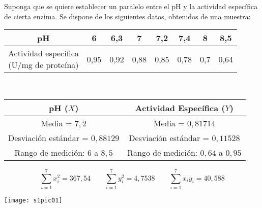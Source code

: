 \documentclass[11pt,spanish]{exam}
\begin{document}
\begin{questions}

\bigskip

\question
Suponga que se quiere establecer un paralelo entre el pH y la actividad específica de cierta enzima. Se dispone de los siguientes datos, obtenidos de una muestra:

\begin{center}
\begin{tabular}{c|ccccccc}
\toprule
pH & 6 & 6,3 & 7 & 7,2 & 7,4 & 8 & 8,5 \\
\hline
\specialcell{Actividad específica \\ (U/mg de proteína)} & 0,95 & 0,92 & 0,88 & 0,85 & 0,78 & 0,7 & 0,64 \\
\bottomrule
\end{tabular}\\[2ex]

\begin{tabular}{cc}
\toprule
pH ($X$) & Actividad Específica ($Y$) \\
\midrule
Media = $7,2$ & Media = $0,81714$ \\
Desviación estándar = $0,88129$ & Desviación estándar = $0,11528$ \\
Rango de medición: $6$ a $8,5$ & Rango de medición: $0,64$ a $0,95$ \\
\bottomrule
\end{tabular}
\end{center}
$$
\sum_{i=1}^7 x_i^2 = 367,54 \qquad  \sum_{i=1}^7 y_i^2 = 4,7538 \qquad \sum_{i=1}^7 x_iy_i =  40,588
$$


\otrapagina
\begin{center}
\texttt{[image: s1pic01]}
\end{center}
\end{questions}
\end{document}
